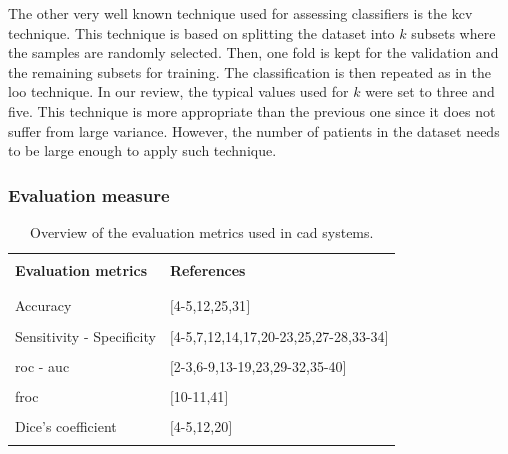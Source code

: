 The other very well known technique used for assessing classifiers is the \acf{kcv} technique. This technique is based on splitting the dataset into $k$ subsets where the samples are randomly selected. Then, one fold is kept for the validation and the remaining subsets for training. The classification is then repeated as in the \ac{loo} technique. In our review, the typical values used for $k$ were set to three and five. This technique is more appropriate than the previous one since it does not suffer from large variance. However, the number of patients in the dataset needs to be large enough to apply such technique.

\subsubsection{Evaluation measure}\label{subsubsec:eval}

\begin{table}
	\caption{Overview of the evaluation metrics used in \ac{cad} systems.}
	\small
	\begin{tabular}{p{.55\linewidth} p{.35\linewidth}}
		\hline \\ [-1.5ex]
		\textbf{Evaluation metrics} & \textbf{References} \\ \\ [-1.5ex]
		\hline \\ [-1.5ex]
		\quad Accuracy & $[$4-5,12,25,31$]$ \\ \\ [-1.5ex]
		\quad Sensitivity - Specificity & $[$4-5,7,12,14,17,20-23,25,27-28,33-34$]$ \\ \\ [-1.5ex]
		\quad \acs{roc} - \acs{auc} & $[$2-3,6-9,13-19,23,29-32,35-40$]$ \\ \\ [-1.5ex]
		\quad \acs{froc} & $[$10-11,41$]$ \\ \\ [-1.5ex]
		\quad Dice's coefficient & $[$4-5,12,20$]$ \\ \\ [-1.5ex]
		\hline
	\end{tabular}
	\label{tab:evatec}
\end{table}

